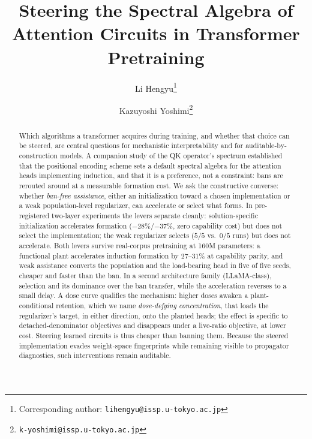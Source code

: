 \documentclass[11pt]{article}
\title{\textbf{Steering the Spectral Algebra of Attention Circuits in Transformer Pretraining}}
\author[1]{Li Hengyu\thanks{Corresponding author: \texttt{lihengyu@issp.u-tokyo.ac.jp}}}
\author[1]{Kazuyoshi Yoshimi\thanks{\texttt{k-yoshimi@issp.u-tokyo.ac.jp}}}
\affil[1]{Institute for Solid State Physics, The University of Tokyo}
\date{}
\begin{document}
\maketitle

\begin{abstract}
Which algorithms a transformer acquires during training, and whether that choice can be steered, are central
questions for mechanistic interpretability and for auditable-by-construction models.
A companion study of the QK operator's spectrum established that the positional encoding scheme sets a default spectral algebra for the
attention heads implementing induction, and that it is a preference, not a constraint: bans are
rerouted around at a measurable formation cost. We ask the constructive converse: whether
\emph{ban-free assistance}, either an initialization toward a chosen implementation or a weak population-level
regularizer, can accelerate or select what forms. In pre-registered two-layer experiments the levers separate
cleanly: solution-specific initialization accelerates formation ($-28\%$/$-37\%$, zero
capability cost) but does not select the implementation; the weak regularizer selects ($5/5$ vs.\
$0/5$ runs) but does not accelerate. Both levers survive real-corpus pretraining at 160M parameters: a functional plant
accelerates induction formation by $27$--$31\%$ at capability parity, and weak assistance converts the
population and the load-bearing head in five of five seeds, cheaper and faster than the ban. In a
second architecture family (LLaMA-class), selection and its dominance over the ban transfer, while the
acceleration reverses to a small delay. A dose curve qualifies the mechanism: higher doses awaken a plant-conditional retention, which we name \emph{dose-defying
concentration}, that loads the regularizer's target, in either direction, onto the planted heads; the effect is specific to
detached-denominator objectives and disappears under a live-ratio objective, at lower cost. Steering learned circuits is thus cheaper than banning them. Because the steered implementation
evades weight-space fingerprints while remaining visible to propagator diagnostics, such interventions remain
auditable.
\end{abstract}
\end{document}
